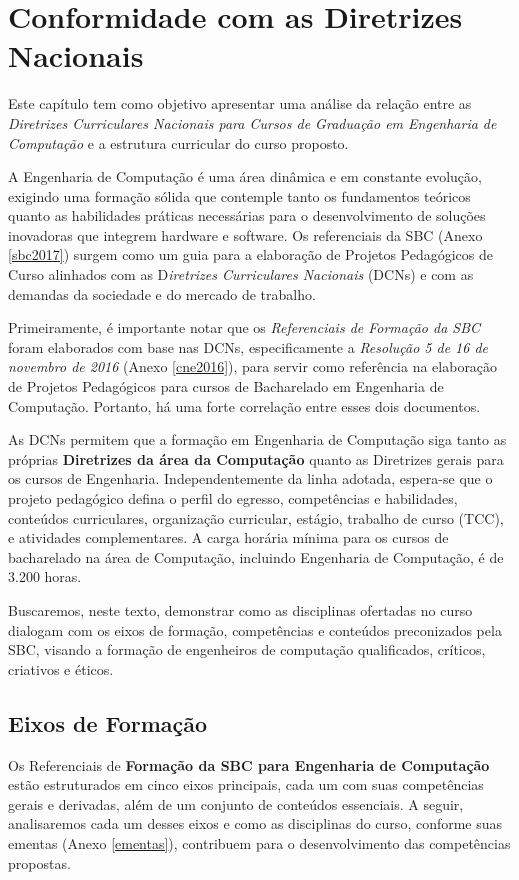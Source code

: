 \chapter{Conformidade com as Diretrizes Nacionais}
\thispagestyle{plain}

Este capítulo tem como objetivo apresentar uma análise da relação entre as \textit{Diretrizes Curriculares Nacionais para Cursos de Graduação em Engenharia de Computação} e a estrutura curricular do curso proposto.

A Engenharia de Computação é uma área dinâmica e em constante evolução, exigindo uma formação sólida que contemple tanto os fundamentos teóricos quanto as habilidades práticas necessárias para o desenvolvimento de soluções inovadoras que integrem hardware e software. Os referenciais da SBC (Anexo \ref{sbc2017}) surgem como um guia para a elaboração de Projetos Pedagógicos de Curso  alinhados com as D\textit{iretrizes Curriculares Nacionais} (DCNs) e com as demandas da sociedade e do mercado de trabalho.

Primeiramente, é importante notar que os \textit{Referenciais de Formação da SBC} foram elaborados com base nas DCNs, especificamente a \textit{Resolução  5 de 16 de novembro de 2016} (Anexo \ref{cne2016}), para servir como referência na elaboração de Projetos Pedagógicos para cursos de Bacharelado em Engenharia de Computação. Portanto, há uma forte correlação entre esses dois documentos.

As DCNs permitem que a formação em Engenharia de Computação siga tanto as próprias \textbf{Diretrizes da área da Computação} quanto as Diretrizes gerais para os cursos de Engenharia. Independentemente da linha adotada, espera-se que o projeto pedagógico defina o perfil do egresso, competências e habilidades, conteúdos curriculares, organização curricular, estágio, trabalho de curso (TCC), e atividades complementares. A carga horária mínima para os cursos de bacharelado na área de Computação, incluindo Engenharia de Computação, é de 3.200 horas.

Buscaremos, neste texto, demonstrar como as disciplinas ofertadas no curso dialogam com os eixos de formação, competências e conteúdos preconizados pela SBC, visando a formação de engenheiros de computação qualificados, críticos, criativos e éticos.

\section{Eixos de Formação}
Os Referenciais de \textbf{Formação da SBC para Engenharia de Computação }estão estruturados em cinco eixos principais, cada um com suas competências gerais e derivadas, além de um conjunto de conteúdos essenciais. A seguir, analisaremos cada um desses eixos e como as disciplinas do curso, conforme suas ementas (Anexo \ref{ementas}), contribuem para o desenvolvimento das competências propostas.

